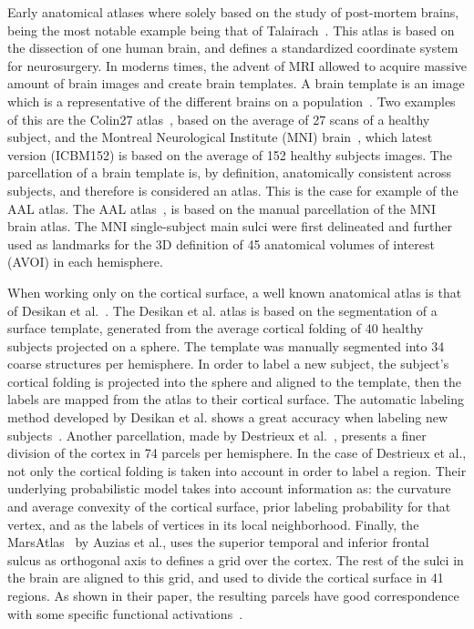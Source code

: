 Early anatomical atlases where solely based on the study of post-mortem brains,
being the most notable example being that of Talairach~\cite{Talairach1988}.
This atlas is based on the dissection of one human brain, and defines a
standardized coordinate system for neurosurgery. In moderns times, the
advent of MRI allowed to acquire massive amount
of brain images and create brain templates. A brain template is an image
which is a representative of the different brains on a population~\cite{Evans2012}. Two
examples of this are the Colin27 atlas~\cite{Collins1998}, based on the average
of 27 scans of a healthy subject, and the Montreal Neurological Institute (MNI) brain~\cite{Holmes1998},
which latest version (ICBM152) is based on the average of 152 healthy subjects images.
The parcellation of a brain template is, by definition, anatomically
consistent across subjects, and therefore is considered an atlas. This is the
case for example of the AAL atlas. The AAL atlas~\cite{Landeau2002}, is based on the manual
parcellation of the MNI brain atlas. The MNI single-subject main sulci were
first delineated and further used as landmarks for the 3D definition of 45
anatomical volumes of interest (AVOI) in each hemisphere.

When working only on the cortical surface, a well known anatomical atlas is that of
Desikan et al.~\cite{Desikan2006}. The Desikan et al. atlas is based on the segmentation
of a surface
template, generated from the average cortical folding of 40 healthy subjects
projected on a sphere. The template was manually segmented into 34 coarse 
structures per hemisphere. In order to label a new subject, the subject's cortical 
folding is projected into the sphere and aligned to the template, then 
the labels are mapped from the atlas to their cortical surface. The automatic
labeling method developed by Desikan et al. shows a great accuracy when labeling
new subjects~\cite{Desikan2006}. Another parcellation, made by 
Destrieux et al.~\cite{Destrieux2010}, presents a finer division of the cortex in
74 parcels per hemisphere. In the case of Destrieux et al., not only the cortical
folding is taken into account in order to label a region. Their
underlying probabilistic model takes into account information as: the curvature
and average convexity of the cortical surface, prior labeling probability for
that vertex, and as the labels of vertices in its local neighborhood.
Finally, the MarsAtlas~\cite{Auzias2016} by Auzias et al., uses the superior temporal
and inferior frontal sulcus as orthogonal axis to defines a grid over the cortex.
The rest of the sulci in the brain are aligned to this grid, and used to divide
the cortical surface in 41 regions. As shown in their paper, the resulting parcels
have good correspondence with some specific functional activations~\cite{Auzias2016}.

